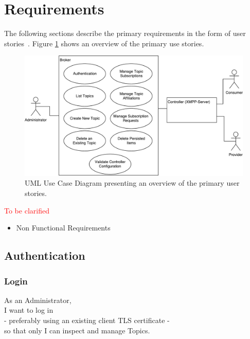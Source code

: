 
\section{Requirements}\label{sec:requirements}

The following sections describe the primary requirements in the form of user stories~\cite{agile-alliance-user-stories}.
Figure \ref{fig:requirements-overview} shows an overview of the primary use stories.

\begin{figure}[h]
    \centering
    \includegraphics[width=1\linewidth]{resources/requirements_overview}
    \caption{UML Use Case Diagram presenting an overview of the primary user stories.}
    \label{fig:requirements-overview}
\end{figure}

\noindent\textcolor{red}{To be clarified}

\begin{itemize}
    \item Non Functional Requirements
\end{itemize}


\subsection{Authentication}
\subsubsection{Login}

As an Administrator,\\
I want to log in\\
- preferably using an existing client TLS certificate - \\
so that only I can inspect and manage Topics.\\

